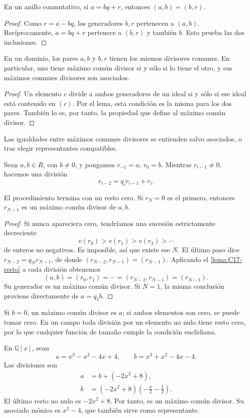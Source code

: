 \begin{lema}\label{lema:C17-resto}
En un anillo conmutativo, si $a=bq+r$, entonces $(a,b)=(b,r)$.
\end{lema}
\begin{proof}
Como $r=a-bq$, los generadores $b,r$ pertenecen a $(a,b)$. Recíprocamente, $a=bq+r$ pertenece a $(b,r)$ y también $b$. Esto prueba las dos inclusiones.
\end{proof}
\begin{coro}\label{coro:C17-mcd-resto}
En un dominio, los pares $a,b$ y $b,r$ tienen los mismos divisores comunes. En particular, uno tiene máximo común divisor si y sólo si lo tiene el otro, y sus máximos comunes divisores son asociados.
\end{coro}
\begin{proof}
Un elemento $c$ divide a ambos generadores de un ideal si y sólo si ese ideal está contenido en $(c)$. Por el lema, esta condición es la misma para los dos pares. También lo es, por tanto, la propiedad que define al máximo común divisor.
\end{proof}
Las igualdades entre máximos comunes divisores se entienden salvo asociados, o tras elegir representantes compatibles.

Sean $a,b\in R$, con $b\ne0$, y pongamos $r_{-1}=a$, $r_0=b$. Mientras $r_{i-1}\ne0$, hacemos una división
\[
r_{i-2}=q_i r_{i-1}+r_i.
\]
\begin{prop}\label{prop:C17-Euclides}
El procedimiento termina con un resto cero. Si $r_N=0$ es el primero, entonces $r_{N-1}$ es un máximo común divisor de $a,b$.
\end{prop}
\begin{proof}
Si nunca apareciera cero, tendríamos una sucesión estrictamente decreciente
\[
v(r_0)>v(r_1)>v(r_2)>\cdots
\]
de enteros no negativos. Es imposible, así que existe ese $N$. El último paso dice $r_{N-2}=q_Nr_{N-1}$, de donde $(r_{N-2},r_{N-1})=(r_{N-1})$. Aplicando el \cref{lema:C17-resto} a cada división obtenemos
\[
(a,b)=(r_0,r_1)=\cdots=(r_{N-2},r_{N-1})=(r_{N-1}).
\]
Su generador es un máximo común divisor. Si $N=1$, la misma conclusión proviene directamente de $a=q_1b$.
\end{proof}
Si $b=0$, un máximo común divisor es $a$; si ambos elementos son cero, se puede tomar cero. En un campo toda división por un elemento no nulo tiene resto cero, por lo que cualquier función de tamaño cumple la condición euclidiana.

\begin{ejem}
En $\mathbb Q[x]$, sean
\[
a=x^3-x^2-4x+4,\qquad b=x^3+x^2-4x-4.
\]
Las divisiones son
\[
\begin{aligned}
a&=b+(-2x^2+8),\\
b&=(-2x^2+8)\left(-\frac{x}{2}-\frac12\right).
\end{aligned}
\]
El último resto no nulo es $-2x^2+8$. Por tanto, es un máximo común divisor. Su asociado mónico es $x^2-4$, que también sirve como representante.
\end{ejem}
